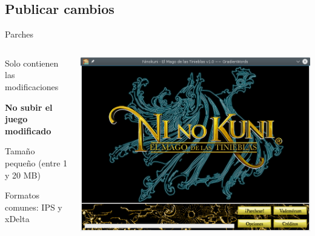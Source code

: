 \subsection{Publicar cambios}
\begin{frame}{Parches}
    \begin{columns}
    \begin{column}{0.6\textwidth}
        \small
        \begin{wideitemize}
            \item<1-> Solo contienen las modificaciones
            \item<2-> \textbf{No subir el juego modificado}
            \item<3-> Tamaño pequeño (entre 1 y 20 MB)
            \item<4-> Formatos comunes: IPS y xDelta
        \end{wideitemize}
    \end{column}
    \begin{column}{0.4\textwidth}
        \includegraphics[width=\textwidth]{imgs/ninopatcher.png}
    \end{column}
    \end{columns}
\end{frame}

